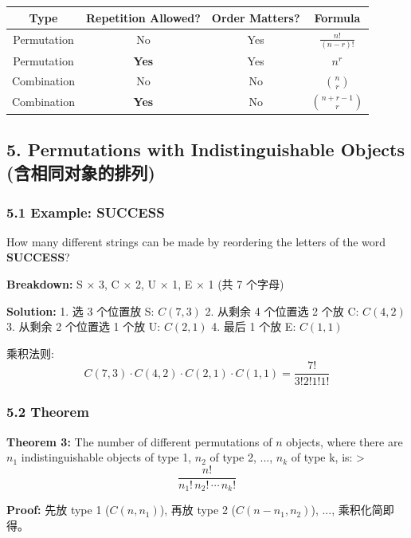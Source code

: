 \documentclass[10pt,a4paper,openany]{ctexbook}
\theoremstyle{definition}
\theoremstyle{remark}
\renewenvironment{quote}
  {\list{}{\leftmargin=1em\rightmargin=0pt\topsep=0.5pt\partopsep=0pt}\item[]}
  {\endlist}
\begin{document}
\begin{center}
\begin{tabular}{cccc}
\hline
Type & Repetition Allowed? & Order Matters? & Formula \\ \hline
Permutation & No & Yes & $\frac{n!}{(n-r)!}$ \\
Permutation & \textbf{Yes} & Yes & $n^r$ \\
Combination & No & No & $\binom{n}{r}$ \\
Combination & \textbf{Yes} & No & $\binom{n+r-1}{r}$ \\
\hline
\end{tabular}

\end{center}

\vspace{-2pt}

\subsection{5. Permutations with Indistinguishable Objects (含相同对象的排列)}

\subsubsection{5.1 Example: SUCCESS}

\begin{quote}
How many different strings can be made by reordering the letters of the word \textbf{SUCCESS}?

\textbf{Breakdown:} S × 3, C × 2, U × 1, E × 1 (共 7 个字母)

\textbf{Solution:}
1. 选 3 个位置放 S: $C(7, 3)$
2. 从剩余 4 个位置选 2 个放 C: $C(4, 2)$
3. 从剩余 2 个位置选 1 个放 U: $C(2, 1)$
4. 最后 1 个放 E: $C(1, 1)$

乘积法则:
\[
C(7,3) \cdot C(4,2) \cdot C(2,1) \cdot C(1,1) = \frac{7!}{3!2!1!1!}
\]


\end{quote}

\subsubsection{5.2 Theorem}

\begin{quote}
\textbf{Theorem 3:} The number of different permutations of $n$ objects, where there are $n_1$ indistinguishable objects of type 1, $n_2$ of type 2, ..., $n_k$ of type k, is:
>
\[
\frac{n!}{n_1! \, n_2! \, \cdots \, n_k!}
\]


\textbf{Proof:} 先放 type 1 ($C(n, n_1)$), 再放 type 2 ($C(n-n_1, n_2)$), ..., 乘积化简即得。

\end{quote}
\end{document}
